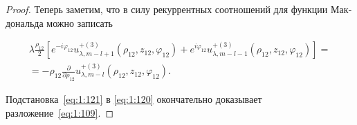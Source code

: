 \begin{russian}
\begin{proof}
Теперь заметим, что в силу рекуррентных соотношений для функции Макдональда можно записать

\begin{multline}\label{eq:1:121}
\lambda \frac{{{\rho _{12}}}}{2}\left[ {{e^{ - i{\varphi _{12}}}}u_{\lambda ,m - l + 1}^{ + (3)}\left( {{\rho _{12}},{z_{12}},{\varphi _{12}}} \right) + {e^{i{\varphi _{12}}}}u_{\lambda ,m - l - 1}^{ + (3)}\left( {{\rho _{12}},{z_{12}},{\varphi _{12}}} \right)} \right] = \\
=  - {\rho _{12}}\frac{\partial }{{\partial {\rho _{12}}}}u_{\lambda ,m - l}^{ + (3)}\left( {{\rho _{12}},{z_{12}},{\varphi _{12}}} \right).
\end{multline}

\noindent Подстановка~\eqref{eq:1:121} в \eqref{eq:1:120} окончательно доказывает разложение~\eqref{eq:1:109}.

\end{proof}
\end{russian}

